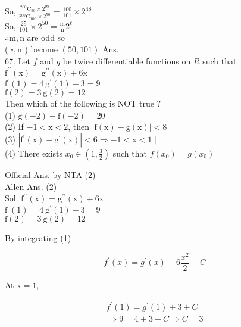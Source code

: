 \documentclass[10pt]{article}
\begin{document}
So, \(\frac{{ }^{200} \mathrm{C}_{99} \times 2^{98}}{{ }^{200} \mathrm{C}_{100} \times 2^{50}}=\frac{100}{101} \times 2^{48}\)\\
So, \(\frac{25}{101} \times 2^{50}=\frac{\mathrm{m}}{\mathrm{n}} 2^{\ell}\)\\
\(\therefore \mathrm{m}, \mathrm{n}\) are odd so\\
( \(\square, \mathrm{n}\) ) become \((50,101)\) Ans.\\
67. Let \(f\) and \(g\) be twice differentiable functions on \(R\) such that\\
\(\mathrm{f}^{\prime \prime}(\mathrm{x})=\mathrm{g}^{\prime \prime}(\mathrm{x})+6 \mathrm{x}\)\\
\(\mathrm{f}^{\prime}(1)=4 \mathrm{~g}^{\prime}(1)-3=9\)\\
\(\mathrm{f}(2)=3 \mathrm{~g}(2)=12\)\\
Then which of the following is NOT true ?\\
(1) \(\mathrm{g}(-2)-\mathrm{f}(-2)=20\)\\
(2) If \(-1<\mathrm{x}<2\), then \(|\mathrm{f}(\mathrm{x})-\mathrm{g}(\mathrm{x})|<8\)\\
(3) \(\left|\mathrm{f}^{\prime}(\mathrm{x})-\mathrm{g}^{\prime}(\mathrm{x})\right|<6 \Rightarrow-1<\mathrm{x}<1 \mid\)\\
(4) There exists \(x_{0} \in\left(1, \frac{3}{2}\right)\) such that \(f\left(x_{0}\right)=g\left(x_{0}\right)\)

Official Ans. by NTA (2)\\
Allen Ans. (2)\\
Sol. \(\mathrm{f}^{\prime \prime}(\mathrm{x})=\mathrm{g}^{\prime \prime}(\mathrm{x})+6 \mathrm{x}\)\\
\(\mathrm{f}^{\prime}(1)=4 \mathrm{~g}^{\prime}(1)-3=9\)\\
\(\mathrm{f}(2)=3 \mathrm{~g}(2)=12\)

By integrating (1)

\[
f^{\prime}(x)=g^{\prime}(x)+6 \frac{x^{2}}{2}+C
\]

At \(\mathrm{x}=1\),

\[
\begin{gathered}
f^{\prime}(1)=g^{\prime}(1)+3+C \\
\Rightarrow 9=4+3+C \Rightarrow C=3
\end{gathered}
\]
\end{document}
